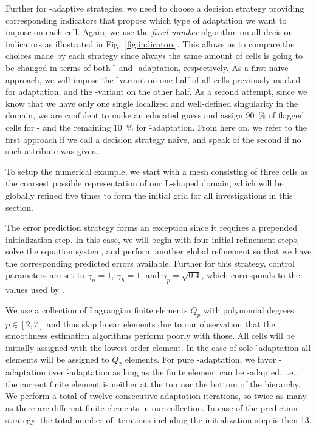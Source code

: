 
Further for \hp-adaptive strategies, we need to choose a decision strategy providing corresponding indicators that propose which type of adaptation we want to impose on each cell.
%
Again, we use the \textit{fixed-number} algorithm on all decision indicators as illustrated in Fig.~\ref{fig:indicators}. This allows us to compare the choices made by each strategy since always the same amount of cells is going to be changed in terms of both \h- and \p-adaptation, respectively.
%
As a first naive approach, we will impose the \h-variant on one half of all cells previously marked for adaptation, and the \p-variant on the other half.
As a second attempt, since we know that we have only one single localized and well-defined singularity in the domain, we are confident to make an educated guess and assign \SI{90}{\percent} of flagged cells for \p- and the remaining \SI{10}{\percent} for \h-adaptation. From here on, we refer to the first approach if we call a decision strategy naive, and speak of the second if no such attribute was given.

To setup the numerical example, we start with a mesh consisting of three cells as the coarsest possible representation of our L-shaped domain, which will be globally refined five times to form the initial grid for all investigations in this section.

The error prediction strategy forms an exception since it requires a prepended initialization step. In this case, we will begin with four initial refinement steps, solve the equation system, and perform another global refinement so that we have the corresponding predicted errors available. Further for this strategy, control parameters are set to $\gamma_n = 1$, $\gamma_h = 1$, and $\gamma_p = \sqrt{0.4}$, which corresponds to the values used by \textcites{melenk2001}{mitchell2014}.

We use a collection of Lagrangian finite elements $Q_p$ with polynomial degrees $p \in [2,7]$ and thus skip linear elements due to our observation that the smoothness estimation algorithms perform poorly with those. All cells will be initially assigned with the lowest order element. In the case of sole \h-adaptation all elements will be assigned to $Q_2$ elements. For pure \p-adaptation, we favor \p-adaptation over \h-adaptation as long as the finite element can be \p-adapted, i.e., the current finite element is neither at the top nor the bottom of the hierarchy. We perform a total of twelve consecutive adaptation iterations, so twice as many as there are different finite elements in our collection. In case of the prediction strategy, the total number of iterations including the initialization step is then 13.

